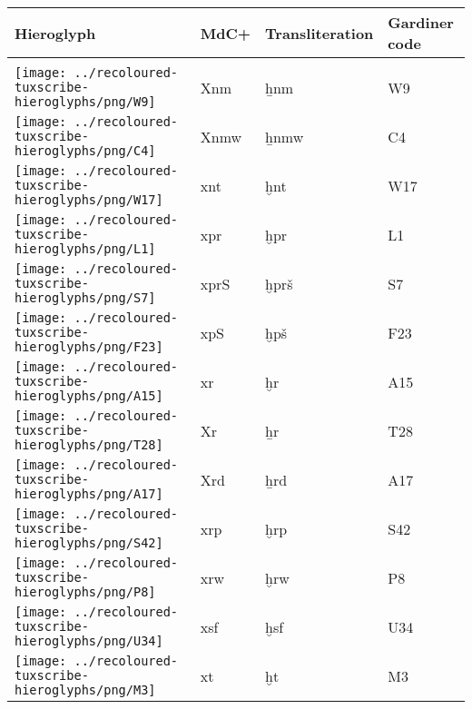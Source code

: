 \begin{center}
	\begin{tabularx}{\linewidth}{YYYY}
		Hieroglyph & MdC+ & Transliteration & Gardiner code\\
		\hline\\
		\texttt{[image: ../recoloured-tuxscribe-hieroglyphs/png/W9]} & Xnm & ẖnm & W9 \\ 
		\texttt{[image: ../recoloured-tuxscribe-hieroglyphs/png/C4]} & Xnmw & ẖnmw & C4 \\ 
		\texttt{[image: ../recoloured-tuxscribe-hieroglyphs/png/W17]} & xnt & ḫnt & W17 \\ 
		\texttt{[image: ../recoloured-tuxscribe-hieroglyphs/png/L1]} & xpr & ḫpr & L1 \\ 
		\texttt{[image: ../recoloured-tuxscribe-hieroglyphs/png/S7]} & xprS & ḫprš & S7 \\ 
		\texttt{[image: ../recoloured-tuxscribe-hieroglyphs/png/F23]} & xpS & ḫpš & F23 \\ 
		\texttt{[image: ../recoloured-tuxscribe-hieroglyphs/png/A15]} & xr & ḫr & A15 \\ 
		\texttt{[image: ../recoloured-tuxscribe-hieroglyphs/png/T28]} & Xr & ẖr & T28 \\ 
		\texttt{[image: ../recoloured-tuxscribe-hieroglyphs/png/A17]} & Xrd & ẖrd & A17 \\ 
		\texttt{[image: ../recoloured-tuxscribe-hieroglyphs/png/S42]} & xrp & ḫrp & S42 \\ 
		\texttt{[image: ../recoloured-tuxscribe-hieroglyphs/png/P8]} & xrw & ḫrw & P8 \\ 
		\texttt{[image: ../recoloured-tuxscribe-hieroglyphs/png/U34]} & xsf & ḫsf & U34 \\ 
		\texttt{[image: ../recoloured-tuxscribe-hieroglyphs/png/M3]} & xt & ḫt & M3 \\ 
	\end{tabularx}
\end{center}


